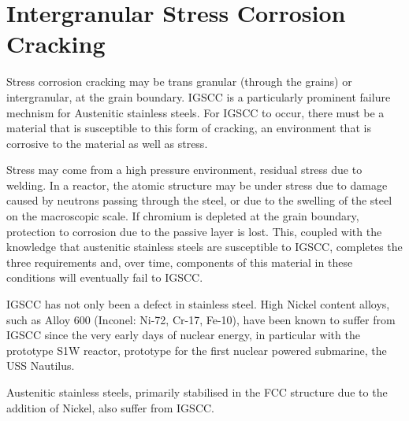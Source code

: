


\section{Intergranular Stress Corrosion Cracking}

Stress corrosion cracking may be trans granular (through the grains) or intergranular, at the grain boundary.  IGSCC is a particularly prominent failure mechnism for Austenitic stainless steels.  For IGSCC to occur, there must be a material that is susceptible to this form of cracking, an environment that is corrosive to the material as well as stress.  

Stress may come from a high pressure environment, residual stress due to welding.  In a reactor, the atomic structure may be under stress due to damage caused by neutrons passing through the steel, or due to the swelling of the steel on the macroscopic scale.  If chromium is depleted at the grain boundary, protection to corrosion due to the passive layer is lost.  This, coupled with the knowledge that austenitic stainless steels are susceptible to IGSCC, completes the three requirements and, over time, components of this material in these conditions will eventually fail to IGSCC.


IGSCC has not only been a defect in stainless steel.  High Nickel content alloys, such as Alloy 600 (Inconel:  Ni-72, Cr-17, Fe-10),  have been known to suffer from IGSCC since the very early days of nuclear energy, in particular with the prototype S1W reactor, prototype for the first nuclear powered submarine, the USS Nautilus.

Austenitic stainless steels, primarily stabilised in the FCC structure due to the addition of Nickel, also suffer from IGSCC.  

